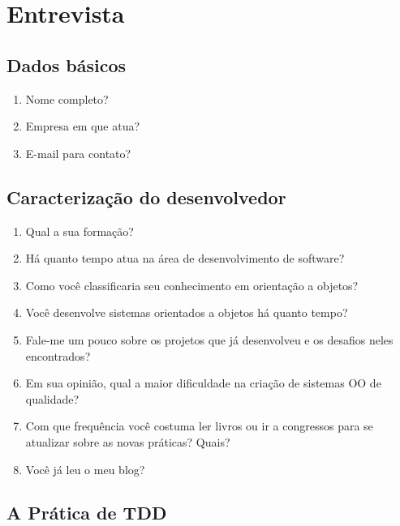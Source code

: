\chapter{Entrevista}
\label{ape:entrevista}

\section{Dados básicos}

\begin{enumerate}
	\item Nome completo?

	\item Empresa em que atua?

	\item E-mail para contato?

\end{enumerate}

\section{Caracterização do desenvolvedor}

\begin{enumerate}
	\item Qual a sua formação?

	\item Há quanto tempo atua na área de desenvolvimento de software?

	\item Como você classificaria seu conhecimento em orientação a objetos?

	\item Você desenvolve sistemas orientados a objetos há quanto tempo?	

	\item Fale-me um pouco sobre os projetos que já desenvolveu e os desafios 
	neles encontrados?

	\item Em sua opinião, qual a maior dificuldade na criação de sistemas OO de
	qualidade?

	\item Com que frequência você costuma ler livros ou ir a congressos para se 
	atualizar sobre as novas práticas? Quais?
	
	\item Você já leu o meu blog?
\end{enumerate}

\section{A Prática de TDD}

